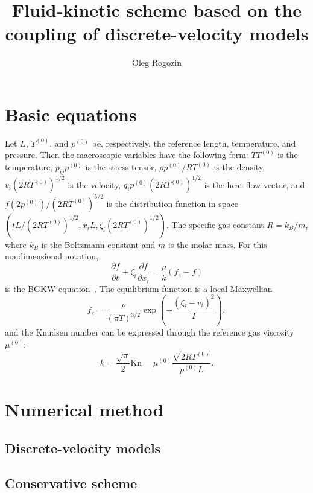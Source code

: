 \documentclass{article}
\title{Fluid-kinetic scheme based on the coupling of discrete-velocity models}
\author{Oleg Rogozin}
\theoremstyle{plain}
\newcommand{\Kn}{\mathrm{Kn}}
\newcommand{\pder}[2][]{\frac{\partial#1}{\partial#2}}
\begin{document}
\maketitle
\tableofcontents

\section{Basic equations}

Let \(L\), \(T^{(0)}\), and \(p^{(0)}\) be, respectively, the reference length, temperature, and pressure.
Then the macroscopic variables have the following form:
\(TT^{(0)}\) is the temperature, \(p_{ij}p^{(0)}\) is the stress tensor, \(\rho p^{(0)}/RT^{(0)}\) is the density,
\(v_i(2RT^{(0)})^{1/2}\) is the velocity, \(q_ip^{(0)}(2RT^{(0)})^{1/2}\) is the heat-flow vector,
and \(f(2p^{(0)})/(2RT^{(0)})^{5/2}\) is the distribution function
in space \((tL/(2RT^{(0)})^{1/2}, x_iL, \zeta_i(2RT^{(0)})^{1/2})\).
The specific gas constant \(R = k_B/m\), where \(k_B\) is the Boltzmann constant and \(m\) is the molar mass.
For this nondimensional notation,
\begin{equation}\label{eq:bgkw}
    \pder[f]{t} + \zeta_i\pder[f]{x_i} = \frac{\rho}k(f_e-f)
\end{equation}
is the BGKW equation~\cite{Krook1954, Welander1954}.
The equilibrium function is a local Maxwellian
\begin{equation}\label{eq:Maxwellian}
    f_e = \frac{\rho}{(\pi T)^{3/2}}\exp\left(-\frac{(\zeta_i - v_i)^2}T\right),
\end{equation}
and the Knudsen number can be expressed through the reference gas viscosity \(\mu^{(0)}\):
\begin{equation}\label{eq:Knudsen_number}
    k = \frac{\sqrt\pi}2\Kn = \mu^{(0)} \frac{\sqrt{2RT^{(0)}}}{p^{(0)}L}.
\end{equation}

\section{Numerical method}

\subsection{Discrete-velocity models}

\subsection{Conservative scheme}
\end{document}
